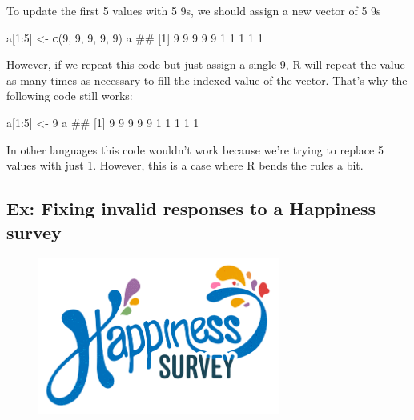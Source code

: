 \documentclass[]{book}
\newenvironment{Shaded}{\begin{snugshade}}{\end{snugshade}}
\newcommand{\KeywordTok}[1]{\textcolor[rgb]{0.13,0.29,0.53}{\textbf{{#1}}}}
\newcommand{\DecValTok}[1]{\textcolor[rgb]{0.00,0.00,0.81}{{#1}}}
\newcommand{\StringTok}[1]{\textcolor[rgb]{0.31,0.60,0.02}{{#1}}}
\newcommand{\NormalTok}[1]{{#1}}
\theoremstyle{definition}
\theoremstyle{definition}
\theoremstyle{remark}
\begin{document}
To update the first 5 values with 5 9s, we should assign a new vector of
5 9s

\begin{Shaded}
\begin{Highlighting}[]
\NormalTok{a[}\DecValTok{1}\NormalTok{:}\DecValTok{5}\NormalTok{] <-}\StringTok{ }\KeywordTok{c}\NormalTok{(}\DecValTok{9}\NormalTok{, }\DecValTok{9}\NormalTok{, }\DecValTok{9}\NormalTok{, }\DecValTok{9}\NormalTok{, }\DecValTok{9}\NormalTok{)}
\NormalTok{a}
\NormalTok{##  [1] 9 9 9 9 9 1 1 1 1 1}
\end{Highlighting}
\end{Shaded}

However, if we repeat this code but just assign a single 9, R will
repeat the value as many times as necessary to fill the indexed value of
the vector. That's why the following code still works:

\begin{Shaded}
\begin{Highlighting}[]
\NormalTok{a[}\DecValTok{1}\NormalTok{:}\DecValTok{5}\NormalTok{] <-}\StringTok{ }\DecValTok{9}
\NormalTok{a}
\NormalTok{##  [1] 9 9 9 9 9 1 1 1 1 1}
\end{Highlighting}
\end{Shaded}

In other languages this code wouldn't work because we're trying to
replace 5 values with just 1. However, this is a case where R bends the
rules a bit.

\subsection{Ex: Fixing invalid responses to a Happiness
survey}\label{ex-fixing-invalid-responses-to-a-happiness-survey}

\begin{figure}

{\centering \includegraphics[width=300px]{images/happiness} 

}

\end{figure}
\end{document}
